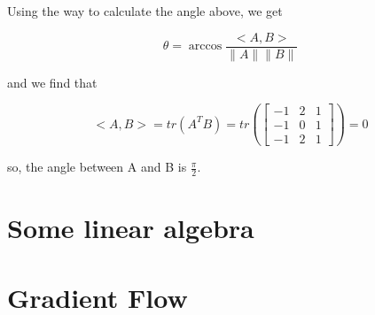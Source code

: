 \documentclass[titlepage]{article}
\begin{document}
Using the way to calculate the angle above, we get 

\begin{equation}
    \theta = \arccos{\frac{<A,B>}{\|A\|\|B\|}}
\end{equation}

and we find that

\begin{equation}
    <A,B>=tr(A^TB)=tr(
    \begin{bmatrix}
        -1 & 2 & 1 \\
        -1 & 0 & 1 \\
        -1 & 2 & 1
    \end{bmatrix})
    =0
\end{equation}

so, the angle between A and B is $\frac{\pi}{2}$.

\section{Some linear algebra}
\section{Gradient Flow}
\end{document}

